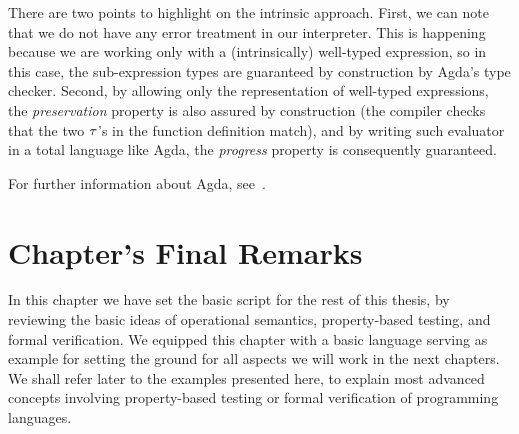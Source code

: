 \documentclass[tese,capa,english]{texufpel}
\def\resethooks{%
  \global\let\SaveRestoreHook\empty
  \global\let\ColumnHook\empty}
\let\hspre\empty
\let\hspost\empty
\newcommand{\D}[1]{\blue{\mathsf{#1}}}
\newcommand{\Con}[1]{\green{\mathsf{#1}}}
\newcommand{\F}[1]{\blue{\mathsf{#1}}}
\newcommand{\V}[1]{\black{\mathsf{#1}}}
\newcommand{\HC}[1]{\green{\mathsf{#1}}}
\begin{document}
\resethooks

There are two points to highlight on the intrinsic approach. First, we can note that we do not have any error treatment in our interpreter. This is happening because we are working only with a (intrinsically) well-typed expression, so in this case, the sub-expression types are guaranteed by construction by Agda's type checker. Second, by allowing only the representation of well-typed expressions, the \emph{preservation} property is also assured by construction (the compiler checks that the two \ensuremath{\V{\tau}}'s in the function definition match), and by writing such evaluator in a total language like Agda, the \emph{progress} property is consequently guaranteed.

For further information about Agda, see~\cite{Norell2009,Stump2016,Wadler-plfa}.

\section{Chapter's Final Remarks}

In this chapter we have set the basic script for the rest of this thesis, by reviewing the basic ideas of operational semantics, property-based testing, and formal verification. We equipped this chapter with a basic language serving as example for setting the ground for all aspects we will work in the next chapters. We shall refer later to the examples presented here, to explain most advanced concepts involving property-based testing or formal verification of programming languages. 
\end{document}
